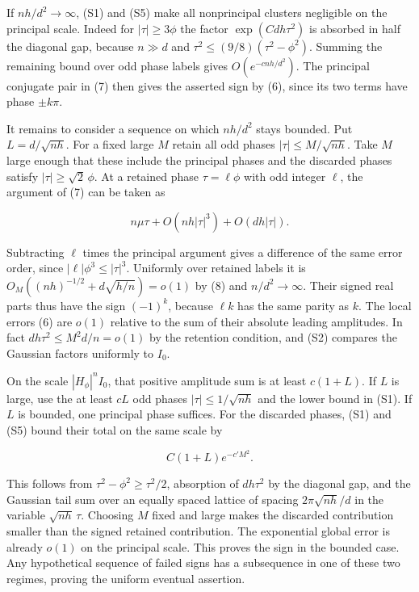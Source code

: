 If $nh/d^2\to\infty$, (S1) and (S5) make all nonprincipal clusters negligible on the principal scale. Indeed for $|\tau|\ge3\phi$ the factor $\exp(Cdh\tau^2)$ is absorbed in half the diagonal gap, because $n\gg d$ and $\tau^2\le(9/8)(\tau^2-\phi^2)$. Summing the remaining bound over odd phase labels gives $O(e^{-cnh/d^2})$. The principal conjugate pair in (7) then gives the asserted sign by (6), since its two terms have phase $\pm k\pi$.

It remains to consider a sequence on which $nh/d^2$ stays bounded. Put $L=d/\sqrt{nh}$. For a fixed large $M$ retain all odd phases $|\tau|\le M/\sqrt{nh}$. Take $M$ large enough that these include the principal phases and the discarded phases satisfy $|\tau|\ge\sqrt2\,\phi$. At a retained phase $\tau=\ell\phi$ with odd integer $\ell$, the argument of (7) can be taken as

\begin{equation*}
n\mu\tau+O(nh|\tau|^3)+O(dh|\tau|).
\end{equation*}

Subtracting $\ell$ times the principal argument gives a difference of the same error order, since $|\ell|\phi^3\le|\tau|^3$. Uniformly over retained labels it is $O_M((nh)^{-1/2}+d\sqrt{h/n})=o(1)$ by (8) and $n/d^2\to\infty$. Their signed real parts thus have the sign $(-1)^k$, because $\ell k$ has the same parity as $k$. The local errors (6) are $o(1)$ relative to the sum of their absolute leading amplitudes. In fact $dh\tau^2\le M^2d/n=o(1)$ by the retention condition, and (S2) compares the Gaussian factors uniformly to $I_0$.

On the scale $|H_\phi|^n I_0$, that positive amplitude sum is at least $c(1+L)$. If $L$ is large, use the at least $cL$ odd phases $|\tau|\le1/\sqrt{nh}$ and the lower bound in (S1). If $L$ is bounded, one principal phase suffices. For the discarded phases, (S1) and (S5) bound their total on the same scale by

\begin{equation*}
C(1+L)e^{-c'M^2}.
\end{equation*}

This follows from $\tau^2-\phi^2\ge\tau^2/2$, absorption of $dh\tau^2$ by the diagonal gap, and the Gaussian tail sum over an equally spaced lattice of spacing $2\pi\sqrt{nh}/d$ in the variable $\sqrt{nh}\,\tau$. Choosing $M$ fixed and large makes the discarded contribution smaller than the signed retained contribution. The exponential global error is already $o(1)$ on the principal scale. This proves the sign in the bounded case. Any hypothetical sequence of failed signs has a subsequence in one of these two regimes, proving the uniform eventual assertion.

